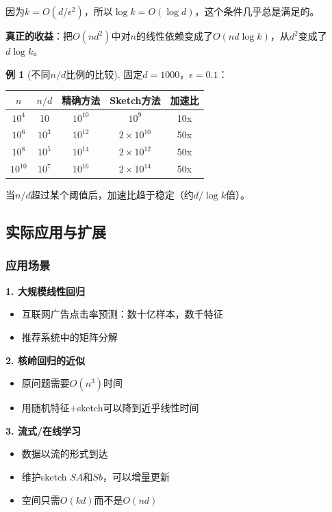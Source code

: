 \documentclass[11pt,a4paper]{ctexart}
\theoremstyle{definition}
\newtheorem{example}[theorem]{例}
\theoremstyle{remark}
\begin{document}
因为$k = O(d/\epsilon^2)$，所以$\log k = O(\log d)$，这个条件几乎总是满足的。

\textbf{真正的收益}：把$O(nd^2)$中对$n$的线性依赖变成了$O(nd\log k)$，从$d^2$变成了$d\log k$。

\begin{example}[不同$n/d$比例的比较]
固定$d = 1000$，$\epsilon = 0.1$：

\begin{center}
\begin{tabular}{ccccc}
\toprule
$n$ & $n/d$ & 精确方法 & Sketch方法 & 加速比 \\
\midrule
$10^4$ & 10 & $10^{10}$ & $10^{9}$ & 10x \\
$10^6$ & $10^3$ & $10^{12}$ & $2\times10^{10}$ & 50x \\
$10^8$ & $10^5$ & $10^{14}$ & $2\times10^{12}$ & 50x \\
$10^{10}$ & $10^7$ & $10^{16}$ & $2\times10^{14}$ & 50x \\
\bottomrule
\end{tabular}
\end{center}

当$n/d$超过某个阈值后，加速比趋于稳定（约$d/\log k$倍）。
\end{example}


\subsection{实际应用与扩展}

\subsubsection{应用场景}

\textbf{1. 大规模线性回归}
\begin{itemize}
    \item 互联网广告点击率预测：数十亿样本，数千特征
    \item 推荐系统中的矩阵分解
\end{itemize}

\textbf{2. 核岭回归的近似}
\begin{itemize}
    \item 原问题需要$O(n^3)$时间
    \item 用随机特征+sketch可以降到近乎线性时间
\end{itemize}

\textbf{3. 流式/在线学习}
\begin{itemize}
    \item 数据以流的形式到达
    \item 维护sketch $SA$和$Sb$，可以增量更新
    \item 空间只需$O(kd)$而不是$O(nd)$
\end{itemize}
\end{document}
